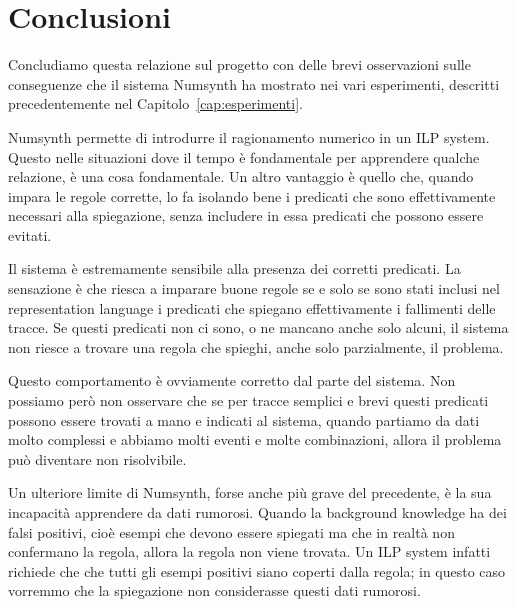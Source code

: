 \chapter{Conclusioni}
Concludiamo questa relazione sul progetto con delle brevi osservazioni sulle conseguenze che il sistema Numsynth ha mostrato nei vari esperimenti, descritti precedentemente nel Capitolo~\ref{cap:esperimenti}.

\myskip

Numsynth permette di introdurre il ragionamento numerico in un ILP system. Questo nelle situazioni dove il tempo è fondamentale per apprendere qualche relazione, è una cosa fondamentale. Un altro vantaggio è quello che, quando impara le regole corrette, lo fa isolando bene i predicati che sono effettivamente necessari alla spiegazione, senza includere in essa predicati che possono essere evitati.

\myskip

Il sistema è estremamente sensibile alla presenza dei corretti predicati. La sensazione è che riesca a imparare buone regole se e solo se sono stati inclusi nel representation language i predicati che spiegano effettivamente i fallimenti delle tracce. Se questi predicati non ci sono, o ne mancano anche solo alcuni, il sistema non riesce a trovare una regola che spieghi, anche solo parzialmente, il problema.

Questo comportamento è ovviamente corretto dal parte del sistema. Non possiamo però non osservare che se per tracce semplici e brevi questi predicati possono essere trovati a mano e indicati al sistema, quando partiamo da dati molto complessi e abbiamo molti eventi e molte combinazioni, allora il problema può diventare non risolvibile.

\myskip

Un ulteriore limite di Numsynth, forse anche più grave del precedente, è la sua incapacità apprendere da dati rumorosi. Quando la background knowledge ha dei falsi positivi, cioè esempi che devono essere spiegati ma che in realtà non confermano la regola, allora la regola non viene trovata. Un ILP system infatti richiede che che tutti gli esempi positivi siano coperti dalla regola; in questo caso vorremmo che la spiegazione non considerasse questi dati rumorosi.
